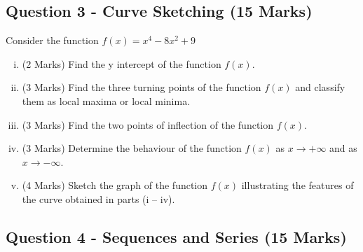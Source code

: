 \documentclass[a4paper,12pt]{article}
\begin{document}
\bigskip
\subsection*{Question 3 - Curve Sketching (15 Marks)}
Consider the function $f(x) = x^4 -  8x^2 + 9$

\begin{enumerate}[(i)]
	\item (2 Marks) Find the y intercept of the function $f(x)$.
	\item (3 Marks) Find the three turning points of the function $f(x)$ and classify them as local
	maxima or local minima.
	\item (3 Marks)  Find the two points of inflection of the function $f(x)$.
	
	\item (3 Marks)  Determine the behaviour of the function $f(x)$ as $x \rightarrow + \infty$ and as $x \rightarrow - \infty $.
	\item (4 Marks) Sketch the graph of the function $f(x)$ illustrating the features of the curve obtained
	in parts (i – iv). 
\end{enumerate}



\subsection*{Question 4 - Sequences and Series (15 Marks)}

\end{document}

